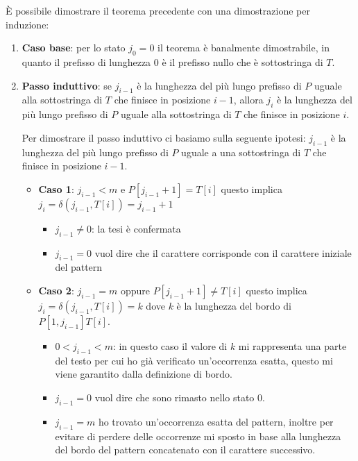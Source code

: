 \begin{dimostrazione}
    È possibile dimostrare il teorema precedente con una dimostrazione per induzione:
    \begin{enumerate}
        \item \textbf{Caso base}: per lo stato $j_0 = 0$ il teorema è banalmente
              dimostrabile, in quanto il prefisso di lunghezza $0$ è il prefisso
              nullo che è sottostringa di $T$.
        \item \textbf{Passo induttivo}: se $j_{i-1}$ è la lunghezza del più lungo
              prefisso di $P$ uguale alla sottostringa di $T$ che finisce in posizione
              $i-1$, allora $j_i$ è la lunghezza del più lungo prefisso di $P$ uguale
              alla sottostringa di $T$ che finisce in posizione $i$.

              Per dimostrare il passo induttivo ci basiamo sulla seguente ipotesi:
              $j_{i-1}$ è la lunghezza del più lungo prefisso di $P$ uguale a una
              sottostringa di $T$ che finisce in posizione $i-1$.
              \begin{itemize}
                  \item \textbf{Caso 1}: $j_{i - 1} < m$ e $P[j_{i - 1} + 1] = T[i]$
                        questo implica $j_i = \delta(j_{i - 1}, T[i]) = j_{i - 1} + 1$
                        \begin{itemize}
                            \item $j_{i - 1} \neq 0$: la tesi è confermata
                            \item $j_{i - 1} = 0$ vuol dire che il carattere
                                  corrisponde con il carattere iniziale del pattern
                        \end{itemize}
                  \item \textbf{Caso 2}: $j_{i - 1} = m$ oppure
                        $P[j_{i - 1} + 1] \neq T[i]$ questo implica
                        $j_i = \delta(j_{i - 1}, T[i]) = k$ dove $k$ è la lunghezza del
                        bordo di $P[1, j_{i - 1}]T[i]$.
                        \begin{itemize}
                            \item $0 < j_{i - 1} < m$: in questo caso il valore
                                  di $k$ mi rappresenta una parte del testo per cui ho
                                  già verificato un'occorrenza esatta, questo mi viene
                                  garantito dalla definizione di bordo.
                            \item $j_{i - 1} = 0$ vuol dire che sono rimasto nello stato 0.
                            \item $j_{i - 1} = m$ ho trovato un'occorrenza esatta
                                  del pattern, inoltre per evitare di perdere delle
                                  occorrenze mi sposto in base alla lunghezza del bordo
                                  del pattern concatenato con il carattere successivo.
                        \end{itemize}
              \end{itemize}
    \end{enumerate}
\end{dimostrazione}
